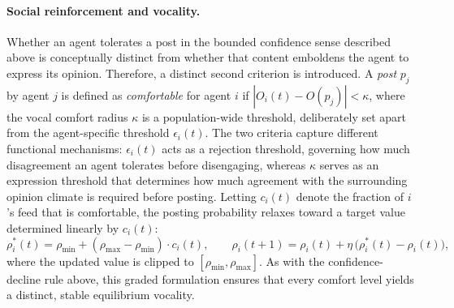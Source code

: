 \documentclass{svproc}
\def\post{\rho}                 %
\def\BoundedConfidence{\epsilon} %
\def\VCR{\kappa}                 %
\begin{document}
\paragraph{Social reinforcement and vocality.} 
Whether an agent tolerates a post in the bounded confidence sense
described above is conceptually distinct from whether that content
emboldens the agent to express its opinion. Therefore, a distinct
second criterion is introduced. A {\em post} $p_j$ by agent $j$ is
defined as {\em comfortable} for agent $i$ if $|O_i(t)-O(p_j)|<\VCR$, where the vocal comfort
radius $\VCR$ is a population-wide threshold, deliberately set apart
from the agent-specific threshold $\BoundedConfidence_i(t)$. The two
criteria capture different functional mechanisms:
$\BoundedConfidence_i(t)$ acts as a rejection threshold, governing how
much disagreement an agent tolerates before disengaging, whereas
$\VCR$ serves as an expression threshold that determines how much
agreement with the surrounding opinion climate is required before
posting.
Letting $c_i(t)$ denote the fraction of $i$'s feed that is
comfortable, the posting probability relaxes toward a target value
determined linearly by $c_i(t)$:
%
\begin{equation}
\post_i^{\ast}(t) = \post_{\min} + (\post_{\max}-\post_{\min})\cdot c_i(t), \qquad
\post_i(t{+}1) = \post_i(t) + \eta\,\big(\post_i^{\ast}(t)-\post_i(t)\big),
\end{equation}
%
where the updated value is clipped to
$[\post_{\min},\post_{\max}]$. As with the confidence-decline rule
above, this graded formulation ensures that every comfort level yields
a distinct, stable equilibrium vocality.
\par
\end{document}
